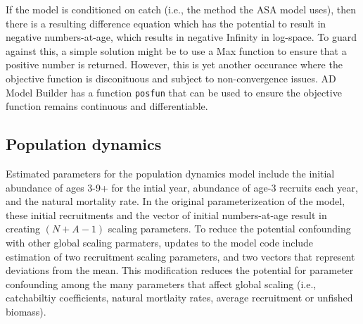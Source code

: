 \documentclass[12pt,letterpaper]{article}
\begin{document}
  If the model is conditioned on catch (i.e., the method the ASA model uses), then there is a resulting difference equation which has the potential to result in negative numbers-at-age, which results in negative Infinity in log-space.  To guard against this, a simple solution might be to use a Max function to ensure that a positive number is returned. However, this is yet another occurance where the objective function is disconituous and subject to non-convergence issues.  AD Model Builder has a function \texttt{posfun} that can be used to ensure the objective function remains continuous and differentiable.


  \subsection{Population dynamics} %
  \label{sub:population_dynamics}
  Estimated parameters for the population dynamics model include the initial abundance of ages 3-9+ for the intial year, abundance of age-3 recruits each year, and the natural mortality rate. In the original parameterizeation of the model, these initial recruitments and the vector of initial numbers-at-age result in creating $(N + A-1)$ scaling parameters.  To reduce the potential confounding with other global scaling parmaters, updates to the model code include estimation of two recruitment scaling parameters, and two vectors that represent deviations from the mean. This modification reduces the potential for parameter confounding among the many parameters that affect global scaling (i.e., catchabiltiy coefficients, natural mortlaity rates, average recruitment or unfished biomass).

    
  

  
\end{document}
